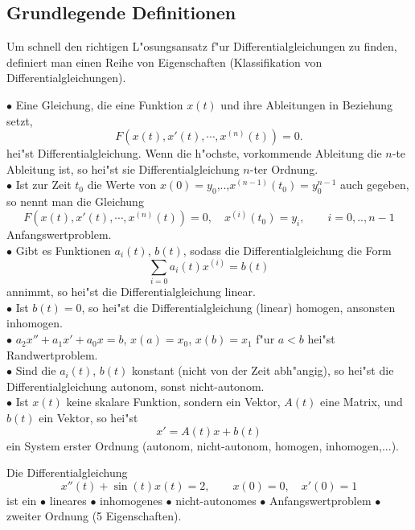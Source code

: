 \subsection{Grundlegende Definitionen}
Um schnell den richtigen L"osungsansatz f"ur Differentialgleichungen zu finden,
definiert man einen Reihe von Eigenschaften (Klassifikation von Differentialgleichungen).
\begin{sdefi}
$\bullet$ Eine Gleichung, die  eine Funktion $x(t)$ und ihre Ableitungen in Beziehung setzt, 
$$ F(x(t), x'(t),\cdots,x^{(n)}(t)) = 0.$$
hei"st Differentialgleichung. Wenn die h"ochste, vorkommende Ableitung  die $n$-te Ableitung
 ist, so hei"st sie Differentialgleichung $n$-ter Ordnung. \\
$\bullet$ Ist zur Zeit $t_0$ die Werte von  $x(0)=y_0$,..,$x^{(n-1)}(t_0)=y^{n-1}_0$ auch gegeben, so nennt man die Gleichung
 $$ F(x(t), x'(t),\cdots,x^{(n)}(t)) = 0,\quad x^{(i)}(t_0)=y_i,\qquad i=0,..,n-1$$
Anfangswertproblem.\\
$\bullet$ Gibt es Funktionen $a_i(t)$, $b(t)$, sodass die Differentialgleichung die Form 
$$ \sum_{i=0}  a_i(t) x^{(i)} = b(t)$$
annimmt, so hei"st die Differentialgleichung linear.\\
$\bullet$  Ist $b(t)=0$, so hei"st die Differentialgleichung (linear) homogen, ansonsten inhomogen. \\
$\bullet$ $a_2x''+ a_1x'+a_0x=b$, $x(a)=x_0$, $x(b)=x_1$ f"ur $a<b$ hei"st Randwertproblem.\\
$\bullet$ Sind die $a_i(t)$, $b(t)$ konstant (nicht von der Zeit abh"angig), 
so hei"st die Differentialgleichung autonom, sonst nicht-autonom.\\
$\bullet$ Ist $x(t)$ keine skalare Funktion, sondern ein Vektor, $A(t)$ eine 
Matrix, und $b(t)$ ein Vektor, so hei"st
$$ x' = A(t) x + b(t)$$
ein System erster Ordnung (autonom, nicht-autonom, homogen, inhomogen,...).
\end{sdefi}
Die Differentialgleichung
$$ x''(t) + \sin(t) x(t) = 2,\qquad x(0)=0, \quad x'(0)=1$$
ist ein $\bullet$ lineares $\bullet$ inhomogenes $\bullet$ nicht-autonomes 
$\bullet$ Anfangswertproblem $\bullet$ zweiter Ordnung (5 Eigenschaften). \\
\par

